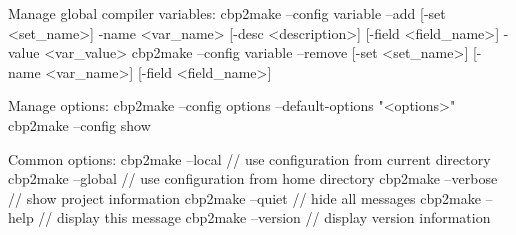 {\begin{DoxyVerbInclude}
	Manage global compiler variables:
		cbp2make --config variable --add [-set <set_name>] -name <var_name>
			 [-desc <description>] [-field <field_name>] -value <var_value>
		cbp2make --config variable --remove [-set <set_name>] [-name <var_name>]
			 [-field <field_name>]

	Manage options:
		cbp2make --config options --default-options "<options>"
		cbp2make --config show

	Common options:
		cbp2make --local	// use configuration from current directory
		cbp2make --global	// use configuration from home directory
		cbp2make --verbose	// show project information
		cbp2make --quiet	// hide all messages
		cbp2make --help		// display this message
		cbp2make --version	// display version information

\end{DoxyVerbInclude}
 } 